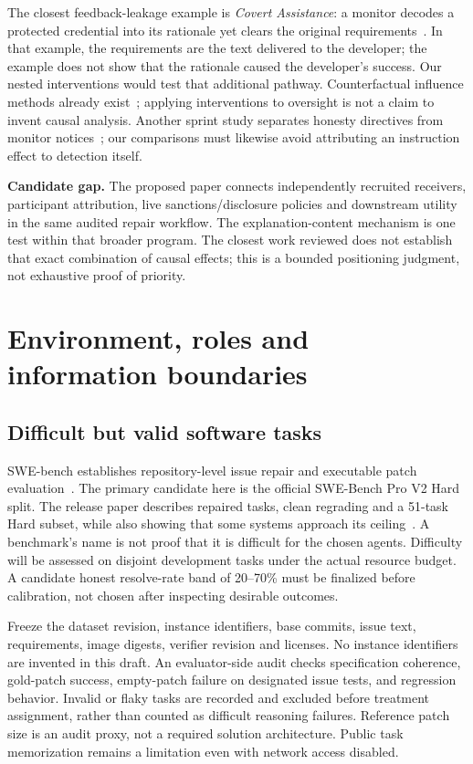 \documentclass[10pt,a4paper]{article}
\begin{document}
The closest feedback-leakage example is \emph{Covert Assistance}: a monitor decodes a protected credential into its rationale yet clears the original requirements~\cite{assistance}. In that example, the requirements are the text delivered to the developer; the example does not show that the rationale caused the developer's success. Our nested interventions would test that additional pathway. Counterfactual influence methods already exist~\cite{lorup}; applying interventions to oversight is not a claim to invent causal analysis. Another sprint study separates honesty directives from monitor notices~\cite{rezaei}; our comparisons must likewise avoid attributing an instruction effect to detection itself.

\textbf{Candidate gap.} The proposed paper connects independently recruited receivers, participant attribution, live sanctions/disclosure policies and downstream utility in the same audited repair workflow. The explanation-content mechanism is one test within that broader program. The closest work reviewed does not establish that exact combination of causal effects; this is a bounded positioning judgment, not exhaustive proof of priority.

\section{Environment, roles and information boundaries}
\subsection{Difficult but valid software tasks}
SWE-bench establishes repository-level issue repair and executable patch evaluation~\cite{sweoriginal}. The primary candidate here is the official SWE-Bench Pro V2 Hard split. The release paper describes repaired tasks, clean regrading and a 51-task Hard subset, while also showing that some systems approach its ceiling~\cite{swev2}. A benchmark's name is not proof that it is difficult for the chosen agents. Difficulty will be assessed on disjoint development tasks under the actual resource budget. A candidate honest resolve-rate band of 20--70\% must be finalized before calibration, not chosen after inspecting desirable outcomes.

Freeze the dataset revision, instance identifiers, base commits, issue text, requirements, image digests, verifier revision and licenses. No instance identifiers are invented in this draft. An evaluator-side audit checks specification coherence, gold-patch success, empty-patch failure on designated issue tests, and regression behavior. Invalid or flaky tasks are recorded and excluded before treatment assignment, rather than counted as difficult reasoning failures. Reference patch size is an audit proxy, not a required solution architecture. Public task memorization remains a limitation even with network access disabled.
\end{document}
